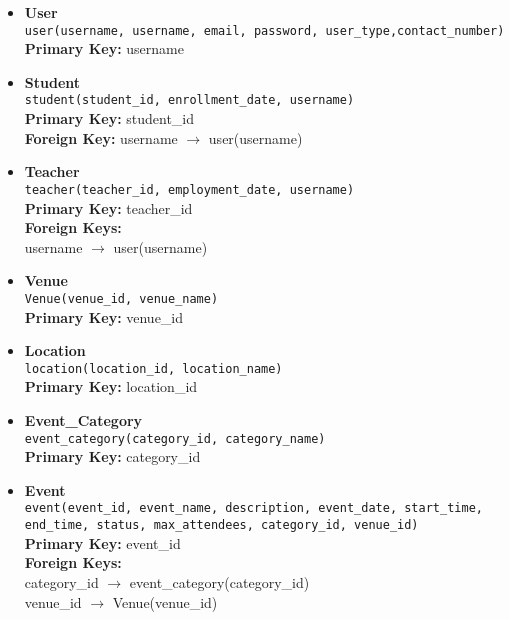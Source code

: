 \begin{itemize}
    \item \textbf{User} \\
        \texttt{user(username, username, email, password, user\_type,contact\_number)} \\
        \textbf{Primary Key:} username \\

    \item \textbf{Student} \\
        \texttt{student(student\_id, enrollment\_date, username)} \\
        \textbf{Primary Key:} student\_id \\
        \textbf{Foreign Key:} username $\rightarrow$ user(username)
    
    \item \textbf{Teacher} \\
        \texttt{teacher(teacher\_id, employment\_date, username)} \\
        \textbf{Primary Key:} teacher\_id \\
        \textbf{Foreign Keys:} \\
        \hspace*{1cm} username $\rightarrow$ user(username)
    
    \item \textbf{Venue} \\
        \texttt{Venue(venue\_id, venue\_name)} \\
        \textbf{Primary Key:} venue\_id
    

    \item \textbf{Location} \\
        \texttt{location(location\_id, location\_name)} \\
        \textbf{Primary Key:} location\_id
        
    \item \textbf{Event\_Category} \\
        \texttt{event\_category(category\_id, category\_name)} \\
        \textbf{Primary Key:} category\_id
        
    \item \textbf{Event} \\
        \texttt{event(event\_id, event\_name, description, event\_date, start\_time, end\_time, status, max\_attendees, category\_id, venue\_id)} \\
        \textbf{Primary Key:} event\_id \\
        \textbf{Foreign Keys:} \\
        \hspace*{1cm} category\_id $\rightarrow$ event\_category(category\_id) \\
        \hspace*{1cm} venue\_id $\rightarrow$ Venue(venue\_id)
        

\end{itemize}
